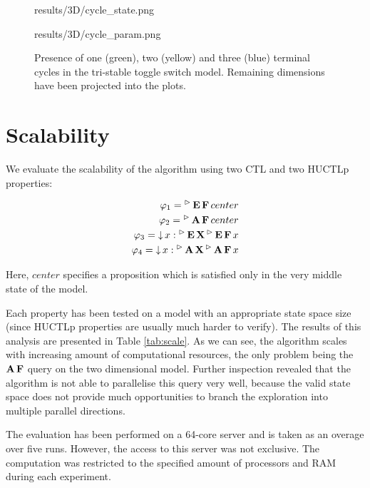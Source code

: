 \begin{figure}
	
	\begin{center}
		\begin{overpic}[width=.5\textwidth]{results/3D/cycle_state.png}\end{overpic}\hfill
		\begin{overpic}[width=.5\textwidth]{results/3D/cycle_param.png}\end{overpic}\hfill
	\end{center}
	
	\caption{Presence of one (green), two (yellow) and three (blue) terminal cycles in the tri-stable toggle switch model. Remaining dimensions have been projected into the plots.}
	\label{fig:triCycle}
\end{figure}

\section{Scalability}

We evaluate the scalability of the algorithm using two \ac{CTL} and two \ac{HUCTLp} properties:

\begin{align*}
	\varphi_1 = {}^\vartriangleright\operatorname{\mathbf{E}}\operatorname{\mathbf{F}} center \\
	\varphi_2 = {}^\vartriangleright\operatorname{\mathbf{A}}\operatorname{\mathbf{F}} center \\
	\varphi_3 = \operatorname{\downarrow} x : {}^\vartriangleright\operatorname{\mathbf{E}}\operatorname{\mathbf{X}} {}^\vartriangleright\operatorname{\mathbf{E}}\operatorname{\mathbf{F}} x \\
	\varphi_4 = \operatorname{\downarrow} x : {}^\vartriangleright\operatorname{\mathbf{A}}\operatorname{\mathbf{X}} {}^\vartriangleright\operatorname{\mathbf{A}}\operatorname{\mathbf{F}} x \\
\end{align*}

Here, $center$ specifies a proposition which is satisfied only in the very middle state of the model.

Each property has been tested on a model with an appropriate state space size (since \ac{HUCTLp} properties are usually much harder to verify). The results of this analysis are presented in Table \ref{tab:scale}. As we can see, the algorithm scales with increasing amount of computational resources, the only problem being the $\operatorname{\mathbf{A}}\operatorname{\mathbf{F}}$ query on the two dimensional model. Further inspection revealed that the algorithm is not able to parallelise this query very well, because the valid state space does not provide much opportunities to branch the exploration into multiple parallel directions.

The evaluation has been performed on a 64-core server and is taken as an overage over five runs. However, the access to this server was not exclusive. The computation was restricted to the specified amount of processors and RAM during each experiment.


